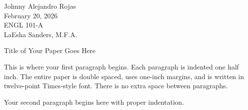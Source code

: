 \documentclass[12pt]{article}
\begin{document}
\noindent
Johnny Alejandro Rojas\\
February 20, 2026\\
ENGL 101-A\\
LaEsha Sanders, M.F.A.

\vspace{1em}

\begin{center}
Title of Your Paper Goes Here
\end{center}

This is where your first paragraph begins. Each paragraph is indented one half
inch. The entire paper is double spaced, uses one-inch margins, and is written
in twelve-point Times-style font. There is no extra space between paragraphs.

Your second paragraph begins here with proper indentation.
\end{document}
